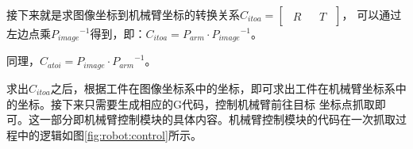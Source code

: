 接下来就是求图像坐标到机械臂坐标的转换关系$C_{itoa} = \left [ \begin{array}{c|c} \begin{matrix} R \end{matrix}& \begin{matrix} T \end{matrix} \end{array} \right ]$，
可以通过左边点乘${P_{image}}^{-1}$得到，即：$C_{itoa} =  P_{arm} \cdot {P_{image}}^{-1}$。

同理，$C_{atoi} =  P_{image} \cdot {P_{arm}}^{-1}$。

求出$C_{itoa}$之后，根据工件在图像坐标系中的坐标，即可求出工件在机械臂坐标系中的坐标。接下来只需要生成相应的G代码，控制机械臂前往目标
坐标点抓取即可。这一部分即机械臂控制模块的具体内容。机械臂控制模块的代码在一次抓取过程中的逻辑如图\ref{fig:robot:control}所示。

